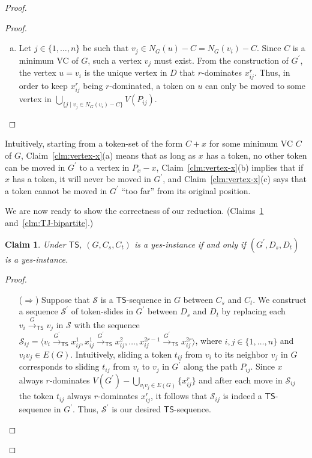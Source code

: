 \documentclass[a4paper]{article}
\theoremstyle{plain}
\newtheorem{claim}{Claim}[theorem]
\theoremstyle{definition}
\newcommand{\sfTS}{{\mathsf{TS}}} %
\newcommand{\sfR}{{\mathsf{R}}} %
\newcommand{\calS}{{\mathcal{S}}}
\newcommand{\reconf}[2][\sfR]{\overset{#2}{\longrightarrow}_{#1}} %
\begin{document}
\begin{proof}
\begin{proof}
\begin{enumerate}[(a)]
			\item Let $j \in \{1, \dots, n\}$ be such that $v_j \in N_G(u) - C = N_G(v_i) - C$.
			Since $C$ is a minimum VC of $G$, such a vertex $v_j$ must exist.
			From the construction of $G^\prime$, the vertex $u = v_i$ is the unique vertex in $D$ that $r$-dominates $x_{ij}^r$.
			Thus, in order to keep $x_{ij}^r$ being $r$-dominated, a token on $u$ can only be moved to some vertex in $\bigcup_{\{j \mid v_j \in N_G(v_i) - C\}}V(P_{ij})$.
		\end{enumerate}
	\end{proof}
	Intuitively, starting from a token-set of the form $C + x$ for some minimum VC $C$ of $G$, Claim~\ref{clm:vertex-x}(a) means that as long as $x$ has a token, no other token can be moved in $G^\prime$ to a vertex in $P_x - x$, Claim~\ref{clm:vertex-x}(b) implies that if $x$ has a token, it will never be moved in $G^\prime$, and Claim~\ref{clm:vertex-x}(c) says that a token cannot be moved in $G^\prime$ ``too far'' from its original position.
	
	We are now ready to show the correctness of our reduction.
	(Claims~\ref{clm:TS-bipartite} and~\ref{clm:TJ-bipartite}.)
	\begin{claim}\label{clm:TS-bipartite}
		Under $\sfTS$, $(G, C_s, C_t)$  is a yes-instance if and only if $(G^\prime, D_s, D_t)$ is a yes-instance.
	\end{claim}
	\begin{proof}
		\begin{itemize}
			\item[($\Rightarrow$)] Suppose that $\calS$ is a $\sfTS$-sequence in $G$ between $C_s$ and $C_t$.
			We construct a sequence $\calS^\prime$ of token-slides in $G^\prime$ between $D_s$ and $D_t$ by replacing each $v_i \reconf[\sfTS]{G} v_j$ in $\calS$ with the sequence $\calS_{ij} = \langle v_i \reconf[\sfTS]{G^\prime} x_{ij}^1, x_{ij}^1 \reconf[\sfTS]{G^\prime} x_{ij}^2, \dots, x_{ij}^{2r-1} \reconf[\sfTS]{G^\prime} x_{ij}^{2r} \rangle$, where $i, j \in \{1, \dots, n\}$ and $v_iv_j \in E(G)$.
			Intuitively, sliding a token $t_{ij}$ from $v_i$ to its neighbor $v_j$ in $G$ corresponds to sliding $t_{ij}$ from $v_i$ to $v_j$ in $G^\prime$ along the path $P_{ij}$.
			Since $x$ always $r$-dominates $V(G^\prime) - \bigcup_{v_iv_j \in E(G)}\{x_{ij}^r\}$ and after each move in $\calS_{ij}$ the token $t_{ij}$ always $r$-dominates $x_{ij}^r$, it follows that $\calS_{ij}$ is indeed a $\sfTS$-sequence in $G^\prime$.
			Thus, $\calS^\prime$ is our desired $\sfTS$-sequence.
			

\end{itemize}
\end{proof}
\end{proof}
\end{document}
